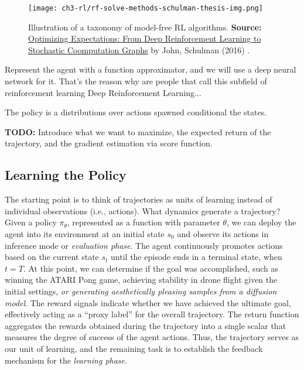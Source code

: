 \begin{figure}[h]
    \centering
    \texttt{[image: ch3-rl/rf-solve-methods-schulman-thesis-img.png]}
    \captionsetup{width=\textwidth} %
    \caption{Illustration of a taxonomy of model-free RL algorithms. \textbf{Source:} \href{https://rail.eecs.berkeley.edu/deeprlcourse/}{Optimizing Expectations: From Deep Reinforcement Learning to Stochastic Coomputation Graphs} by John, Schulman (2016) \cite{schulman2016optimizing}.}
    \label{fig:rl-model-free-taxonomy}
  \end{figure}

Represent the agent with a function approximator, and we will use a deep neural network for it. That's the reason why are people that call this subfield of reinforcement learning Deep Reinforcement Learning...

The policy is a distributions over actions spawned conditional the states.

\textbf{TODO:} Introduce what we want to maximize, the expected return of the trajectory, and the gradient estimation via score function.

\subsection{Learning the Policy}

The starting point is to think of trajectories as units of learning instead of individual observations (i.e., actions). What dynamics generate a trajectory? 
Given a policy $\pi_{\theta}$, represented as a function with parameter $\theta$, we can deploy the agent into its environment at an initial state $s_0$ and observe its actions in inference mode or \textit{evaluation phase}. The agent continuously promotes actions based on the current state $s_{t}$
until the episode ends in a terminal state, when $t=T$. At this point, we can determine if the goal was accomplished, such as winning the ATARI Pong game, achieving stability in drone flight given the initial settings, \textit{or generating aesthetically pleasing samples from a diffusion model}. The reward signals indicate whether we have achieved the ultimate goal, effectively acting as a ``proxy label'' for the overall trajectory. The return function aggregates the rewards obtained during the trajectory into a single scalar that measures the degree of success of the agent actions. Thus, the trajectory serves as our unit of learning, and the remaining task is to establish the feedback mechanism for the \textit{learning phase}. \\


